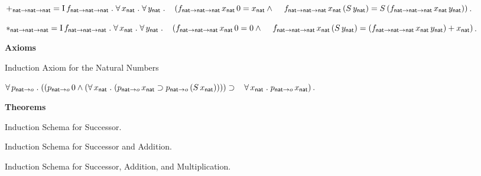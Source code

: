 \documentclass[fleqn,11pt]{article}
\begin{document}
    \item $+_{{\sf nat} \rightarrow {\sf nat} \rightarrow {\sf nat}} =
    \mbox{\rm I}\, f_{{\sf nat} \rightarrow {\sf nat} \rightarrow {\sf nat}} \mathrel.
    \forall\, x_{\sf nat} \mathrel. \forall\, y_{\sf nat} \mathrel. {}\\
    \hspace*{2ex} (f_{{\sf nat} \rightarrow {\sf nat} \rightarrow {\sf nat}} \, 
    x_{\sf nat} \, 0 = x_{\sf nat} \wedge {}\\
    \hspace*{2.8ex}f_{{\sf nat} \rightarrow {\sf nat} \rightarrow {\sf nat}} \, 
    x_{\sf nat} \, (S \, y_{\sf nat}) = S \, 
    (f_{{\sf nat} \rightarrow {\sf nat} \rightarrow {\sf nat}} \, x_{\sf nat} \,
    y_{\sf nat}))$.

    \item $*_{{\sf nat} \rightarrow {\sf nat} \rightarrow {\sf nat}} =
    \mbox{\rm I}\, f_{{\sf nat} \rightarrow {\sf nat} \rightarrow {\sf nat}} \mathrel.
    \forall\, x_{\sf nat} \mathrel. \forall\, y_{\sf nat} \mathrel. {}\\
    \hspace*{2ex} (f_{{\sf nat} \rightarrow {\sf nat} \rightarrow {\sf nat}} \, 
    x_{\sf nat} \, 0 = 0 \wedge {}\\
    \hspace*{2.8ex}f_{{\sf nat} \rightarrow {\sf nat} \rightarrow {\sf nat}} \, 
    x_{\sf nat} \, (S \, y_{\sf nat}) =  
    (f_{{\sf nat} \rightarrow {\sf nat} \rightarrow {\sf nat}} \, x_{\sf nat} \,
    y_{\sf nat}) + x_{\sf nat})$.

  \ee



  \item[] \textbf{Axioms}

  \be

    \setcounter{enumi}{33}

    \item Induction Axiom for the Natural Numbers

    $\forall\, p_{{\sf nat} \rightarrow o} \mathrel. ((p_{{\sf nat} \rightarrow o} \, 0 \wedge 
    (\forall\, x_{\sf nat} \mathrel. (p_{{\sf nat} \rightarrow o} \, x_{\sf nat} \supset 
    p_{{\sf nat} \rightarrow o} \, (S \, x_{\sf nat})))) \supset {}\\
    \hspace*{2ex}\forall\, x_{\sf nat} \mathrel. 
    p_{{\sf nat} \rightarrow o} \, x_{\sf nat})$.

  \ee

  \item[] \textbf{Theorems}

  \be

    \setcounter{enumi}{4}

    \item Induction Schema for Successor.

    \item Induction Schema for Successor and Addition.

    \item Induction Schema for Successor, Addition, and Multiplication.

  \ee

\ei



\end{document}
